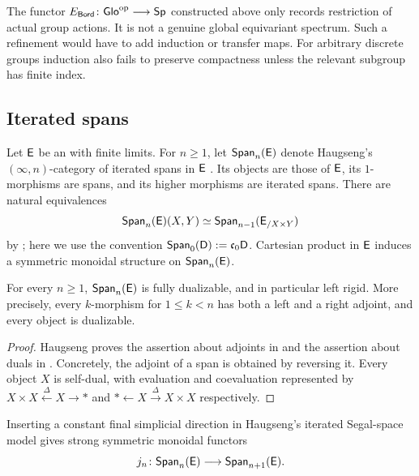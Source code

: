 \documentclass[a4paper,11pt]{article}
\begin{document}
\begin{remark}
  The functor
  $
    E_{\Bord}\colon\Glo^{\op}\longrightarrow\Sp
  $
  constructed above only records restriction of actual group actions.
  It is not a genuine global equivariant spectrum.  Such a refinement
  would have to add induction or transfer maps.
  For arbitrary discrete groups induction also fails to preserve
  compactness unless the relevant subgroup has finite index.  \end{remark}

\subsection{Iterated spans}
\label{sec:iterated-spans}

Let $\oE$ be an \icat{} with finite limits.  For $n\geq1$, let
$\Span_n(\oE)$ denote Haugseng's $(\infty,n)$-category of iterated
spans in $\oE$ \cite{HaugsengSpans}.  Its objects are those of
$\oE$, its $1$-morphisms are spans, and its higher morphisms are
iterated spans.  There are natural equivalences
\begin{equation}\label{eq:span mapping category}
  \Span_n(\oE)(X,Y)
    \simeq \Span_{n-1}(\oE_{/X\times Y})
\end{equation}
by \cite[Proposition~8.3]{HaugsengSpans}; here we use the convention
$\Span_0(\oD):=\core[0]\oD$.  Cartesian product in $\oE$ induces a
symmetric monoidal structure on $\Span_n(\oE)$.

\begin{propn}\label{propn:iterated spans rigid}
  For every $n\geq1$, $\Span_n(\oE)$ is fully dualizable, and in
  particular left rigid.  More precisely, every $k$-morphism for
  $1\leq k<n$ has both a left and a right adjoint, and every object is
  dualizable.
\end{propn}

\begin{proof}
  Haugseng proves the assertion about adjoints in
  \cite[Theorem~12.4]{HaugsengSpans} and the assertion about duals in
  \cite[Corollary~12.5]{HaugsengSpans}.  Concretely, the adjoint of a
  span is obtained by reversing it.  Every object $X$ is self-dual,
  with evaluation and coevaluation represented by
 $
    X\times X\xleftarrow{\Delta}X\longrightarrow *$ and $
    *\longleftarrow X\xrightarrow{\Delta}X\times X$
  respectively.
\end{proof}

Inserting a constant final simplicial direction in Haugseng's
iterated Segal-space model gives strong symmetric monoidal functors
\[
  j_n\colon\Span_n(\oE)\longrightarrow\Span_{n+1}(\oE).
\]
\end{document}
